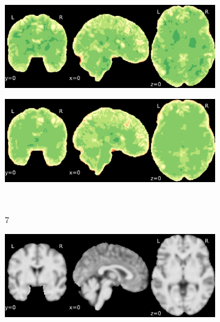\documentclass{article}
\begin{document}
\begin{landscape}
\begin{figure}
\begin{subfigure}[t]{0.2\paperheight}
        \end{subfigure}
        \begin{subfigure}[t]{0.2\paperheight}
            \centering
            \includegraphics[width=\textwidth]{figures/sig/fwhm_5/rs_ds001748_sub-adult16_sig.pdf}
        \end{subfigure}
        \begin{subfigure}[t]{0.2\paperheight}
            \centering
            \includegraphics[width=\textwidth]{figures/sig/fwhm_5/rr.rs_ds001748_sub-adult16_sig.pdf}
        \end{subfigure} \\
        \begin{subfigure}[b][][c]{0.01\paperwidth} 7 \vspace*{15pt} \end{subfigure}
        \begin{subfigure}[t]{0.2\paperheight}
            \centering
            \includegraphics[width=\textwidth]{figures/ieee_T1/fwhm_5/ieee_ds002338_sub-xp201.pdf}

\end{subfigure}
\end{figure}
\end{landscape}
\end{document}
